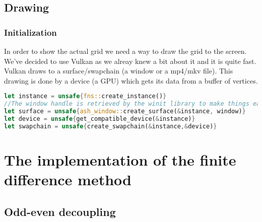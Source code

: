 \documentclass{article}
\begin{document}
\subsection{Drawing}
\subsubsection{Initialization}
In order to show the actual grid we need a way to draw the grid to the screen. We've decided to use Vulkan as we alreay knew a bit about it and it is quite fast.\cite{Vulkan} Vulkan draws to a surface/swapchain (a window or a mp4/mkv file). This drawing is done by a device (a GPU) which gets its data from a buffer of vertices.
\begin{lstlisting}[language=Rust, style=boxed]
let instance = unsafe{fns::create_instance()}
//The window handle is retrieved by the winit library to make things easier
let surface = unsafe{ash_window::create_surface(&instance, window)}
let device = unsafe{get_compatible_device(&instance)}
let swapchain = unsafe{create_swapchain(&instance,&device)}
\end{lstlisting}





\section{The implementation of the finite difference method}
\subsection{Odd-even decoupling}
\end{document}
